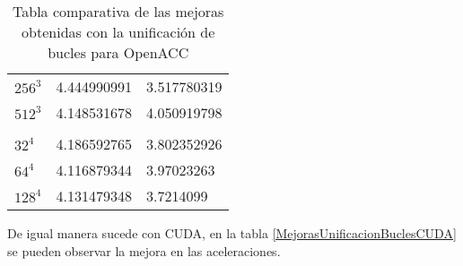 \begin{table}[H]
\begin{tabular}{lll}
    $256^3$   & 4.444990991                                                                                 & 3.517780319                                                                           \\
    $512^3$   & 4.148531678                                                                                 & 4.050919798                                                                           \\
       &                                                                                             &                                                                                       \\
    $32^4$   & 4.186592765                                                                                 & 3.802352926                                                                           \\
    $64^4$   & 4.116879344                                                                                 & 3.97023263                                                                            \\
    $128^4$   & 4.131479348                                                                                 & 3.7214099                                                                            
    \end{tabular}
    \caption{Tabla comparativa de las mejoras obtenidas con la unificación de bucles para OpenACC}
    \label{MejorasUnificacionBuclesOpenACC}
\end{table}
De igual manera sucede con CUDA, en la tabla \ref{MejorasUnificacionBuclesCUDA} se pueden observar la mejora en las aceleraciones.
